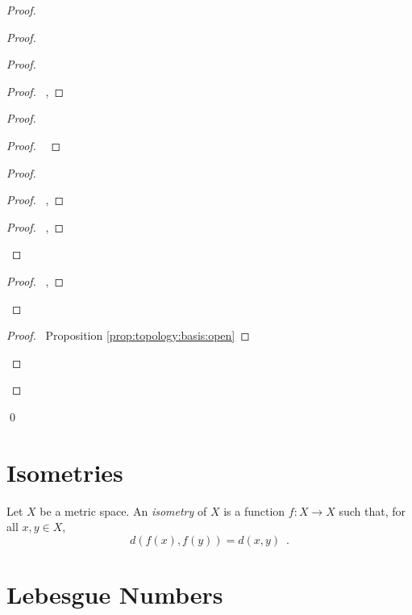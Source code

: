 \begin{proof}
\begin{proof}
\begin{proof}
    \begin{proof}
      \pf\ , 
    \end{proof}
    \begin{proof}
      \begin{proof}
        \pf\ 
      \end{proof}
      \begin{proof}
        \begin{proof}
          \pf\ , 
        \end{proof}
        \qedstep
        \begin{proof}
          \pf\ , 
        \end{proof}
      \end{proof}
      \begin{proof}
        \pf\ , 
      \end{proof}
    \end{proof}
    \qedstep
    \begin{proof}
      \pf\ Proposition \ref{prop:topology:basis:open}
    \end{proof}
  \end{proof}
\end{proof}
\qed
\end{proof}

\section{Isometries}

\begin{df}[Isometry]
  Let $X$ be a metric space. An \emph{isometry} of $X$ is a function $f : X
  \rightarrow X$ such that, for all $x, y \in X$,
  \[ d(f(x), f(y)) = d(x, y) \enspace . \]
\end{df}

\section{Lebesgue Numbers}

